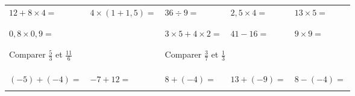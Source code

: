 \documentclass[14]{article}
\begin{document}
    \begin{tabular}{p{3cm}|p{3cm}|p{3cm}|p{3cm}|p{3cm}}
         $12+8\times4=$ & $4\times(1+1,5)=$ & $36\div9 = $ & $2,5\times4=$ & $13\times5=$\\ 
         
         & & & &\\ \hline & & & &\\
         
         $0,8\times 0,9=$ & $ $ & $3\times5+4\times2=$ &  $41-16=$ & $9\times9=$\\
         
         & & & &\\ \hline \multicolumn{2}{c|}{} & \multicolumn{2}{c}{}\\
         
         \multicolumn{2}{l|}{Comparer $\frac{5}{3}$ et $\frac{11}{6}$} & 
         \multicolumn{3}{l}{Comparer $\frac{3}{7}$ et $\frac{1}{3}$}\\
         
        \multicolumn{2}{c|}{} & \multicolumn{3}{c}{} \\[2ex]

        \multicolumn{2}{c|}{} & \multicolumn{2}{c}{}\\ \hline & & & &\\ 

        $(-5)+(-4)=$ & $-7+12=$ & $8+(-4)= $ & $13+(-9)=$ & $8-(-4)=$ \\
        
        & & & &\\ 
    \end{tabular}

\bigskip

\enteteActivite{\monTitre}{\theserie}
\end{document}
